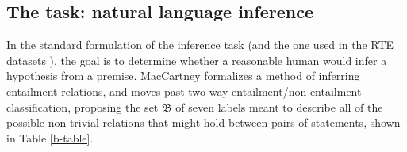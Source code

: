 

\subsection{The task: natural language inference}


In the standard formulation of the inference task (and the one used in the RTE datasets \cite{dagan2006pascal}), the goal is to determine whether a reasonable human would infer a hypothesis from a premise.
MacCartney formalizes a method of inferring entailment relations, and moves past two way entailment/non-entailment classification, proposing the set $\mathfrak{B}$ of seven labels meant to describe all of the possible non-trivial relations that might hold between pairs of statements, shown in Table \ref{b-table}. 

